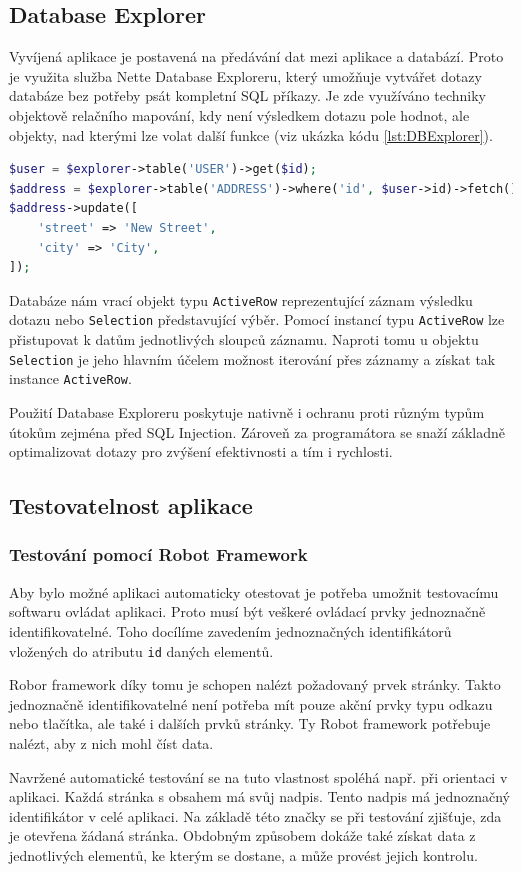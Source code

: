 \documentclass[czech,BP]{thesiskiv}
\begin{document}
		\subsection{Database Explorer}
		\par Vyvíjená aplikace je postavená na předávání dat mezi aplikace a databází. Proto je využita služba Nette Database Exploreru, který umožňuje vytvářet dotazy databáze bez potřeby psát kompletní SQL příkazy. Je zde využíváno techniky objektově relačního mapování, kdy není výsledkem dotazu pole hodnot, ale objekty, nad kterými lze volat další funkce (viz ukázka kódu \ref{lst:DBExplorer}).
		\begin{lstlisting}[language=PHP, caption={Ukázka použití Nette Database Explorer},label={lst:DBExplorer}]
$user = $explorer->table('USER')->get($id);
$address = $explorer->table('ADDRESS')->where('id', $user->id)->fetch();
$address->update([
	'street' => 'New Street',
	'city' => 'City',	
]);
\end{lstlisting}
		\par Databáze nám vrací objekt typu \texttt{ActiveRow} reprezentující záznam výsledku dotazu nebo \texttt{Selection} představující výběr. Pomocí instancí typu \texttt{ActiveRow} lze přistupovat k datům jednotlivých sloupců záznamu. Naproti tomu u objektu \texttt{Selection} je jeho hlavním účelem možnost iterování přes záznamy a získat tak instance \texttt{ActiveRow}. 
		\par Použití Database Exploreru poskytuje nativně i ochranu proti různým typům útokům zejména před SQL Injection. Zároveň za programátora se snaží základně optimalizovat dotazy pro zvýšení efektivnosti a tím i rychlosti.
		
		\subsection{Testovatelnost aplikace}
		\label{sec:testovatelnost}
		\subsubsection{Testování pomocí Robot Framework}
		\par Aby bylo možné aplikaci automaticky otestovat je potřeba umožnit testovacímu softwaru ovládat aplikaci. Proto musí být veškeré ovládací prvky jednoznačně identifikovatelné. Toho docílíme zavedením jednoznačných identifikátorů vložených do atributu \texttt{id} daných elementů.
		\par Robor framework díky tomu je schopen nalézt požadovaný prvek stránky. Takto jednoznačně identifikovatelné není potřeba mít pouze akční prvky typu odkazu nebo tlačítka, ale také i dalších prvků stránky. Ty Robot framework potřebuje nalézt, aby z nich mohl číst data.
		\par Navržené automatické testování se na tuto vlastnost spoléhá např. při orientaci v aplikaci. Každá stránka s obsahem má svůj nadpis. Tento nadpis má jednoznačný identifikátor v celé aplikaci. Na základě této značky se při testování zjišťuje, zda je otevřena žádaná stránka. Obdobným způsobem dokáže také získat data z jednotlivých elementů, ke kterým se dostane, a může provést jejich kontrolu.
		
\end{document}
